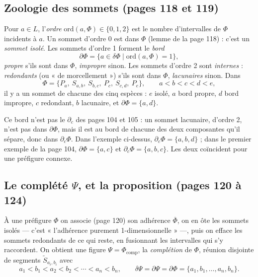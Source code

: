 \documentclass[11pt,a4paper]{article}
\begin{document}
\subsection*{Zoologie des sommets (pages 118 et 119)}

Pour $a \in L$, l'\emph{ordre} $\mathrm{ord}(a, \Phi) \in \{0, 1, 2\}$ est le
nombre d'intervalles de $\Phi$ incidents à $a$. Un sommet d'ordre 0 est dans
$\Phi$ (lemme de la page 118) : c'est un \emph{sommet isolé}. Les sommets
d'ordre 1 forment le \emph{bord}
\[
\partial\Phi = \{a \in \delta\Phi \mid \mathrm{ord}(a,\Phi) = 1\},
\]
\emph{propre} s'ils sont dans $\Phi$, \emph{impropre} sinon. Les sommets d'ordre
2 sont \emph{internes} : \emph{redondants} (ou « de morcellement ») s'ils sont
dans $\Phi$, \emph{lacunaires} sinon. Dans
\[
\Phi = \{P_{a},\ S_{a,b},\ S_{b,c},\ P_{c},\ S_{c,d},\ P_{e}\}, \qquad a < b < c
< d < e,
\]
il y a un sommet de chacune des cinq espèces : $e$ isolé, $a$ bord propre, $d$
bord impropre, $c$ redondant, $b$ lacunaire, et $\partial\Phi = \{a, d\}$.

Ce bord n'est pas le $\partial_{c}$ des pages 104 et 105 : un sommet lacunaire,
d'ordre 2, n'est pas dans $\partial\Phi$, mais il est au bord de chacune des
deux composantes qu'il sépare, donc dans $\partial_{c}\Phi$. Dans l'exemple
ci-dessus, $\partial_{c}\Phi = \{a, b, d\}$ ; dans le premier exemple de la page
104, $\partial\Phi = \{a, c\}$ et $\partial_{c}\Phi = \{a, b, c\}$. Les deux
coïncident pour une préfigure connexe.

\subsection*{Le complété $\Psi$, et la proposition (pages 120 à 124)}

À une préfigure $\Phi$ on associe (page 120) son adhérence $\overline{\Phi}$,
on en ôte les sommets isolés --- c'est « l'adhérence purement
1-dimensionnelle » ---, puis on efface les sommets redondants de ce qui reste,
en fusionnant les intervalles qui s'y raccordent. On obtient une figure
$\Psi = \Phi_{\mathrm{comp}}$, la \emph{complétion} de $\Phi$, réunion
disjointe de segments $\widetilde{S}_{a_{i}, b_{i}}$ avec
\[
a_{1} < b_{1} < a_{2} < b_{2} < \cdots < a_{n} < b_{n}, \qquad \delta\Psi =
\partial\Psi = \partial\Phi = \{a_{1}, b_{1}, \ldots, a_{n}, b_{n}\}.
\]
\end{document}
